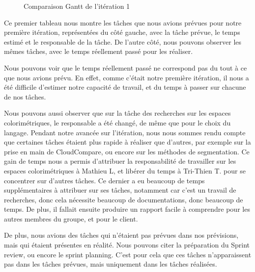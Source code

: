 \documentclass[12pt,titlepage,french]{article}
\begin{document}
\begin{figure}[H]
    \caption{\label{} Comparaison Gantt de l'itération 1}
\end{figure}

Ce premier tableau nous montre les tâches que nous avions prévues pour notre première itération, représentées du côté gauche, avec la tâche prévue, le temps estimé et le responsable de la tâche. De l'autre côté, nous pouvons observer les mêmes tâches, avec le temps réellement passé pour les réaliser. \newline

Nous pouvons voir que le temps réellement passé ne correspond pas du tout à ce que nous avions prévu. En effet, comme c'était notre première itération, il nous a été difficile d'estimer notre capacité de travail, et du temps à passer sur chacune de nos tâches. \newline

Nous pouvons aussi observer que sur la tâche des recherches sur les espaces colorimétriques, le responsable a été changé, de même que pour le choix du langage. Pendant notre avancée sur l'itération, nous nous sommes rendu compte que certaines tâches étaient plus rapide à réaliser que d'autres, par exemple sur la prise en main de CloudCompare, ou encore sur les méthodes de segmentation. Ce gain de temps nous a permis d'attribuer la responsabilité de travailler sur les espaces colorimétriques à Mathieu L, et libérer du temps à Tri-Thien T. pour se concentrer sur d'autres tâches. Ce dernier a eu beaucoup de temps supplémentaires à attribuer sur ses tâches, notamment car c'est un travail de recherches, donc cela nécessite beaucoup de documentations, donc beaucoup de temps. De plus, il fallait ensuite produire un rapport facile à comprendre pour les autres membres du groupe, et pour le client. \newline

De plus, nous avions des tâches qui n'étaient pas prévues dans nos prévisions, mais qui étaient présentes en réalité. Nous pouvons citer la préparation du Sprint review, ou encore le sprint planning. C'est pour cela que ces tâches n'apparaissent pas dans les tâches prévues, mais uniquement dans les tâches réalisées.
\end{document}
